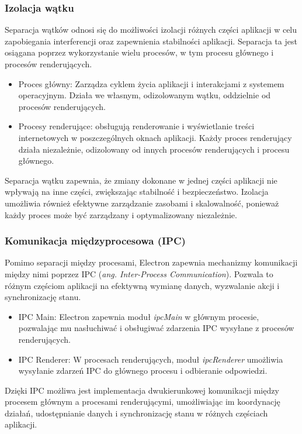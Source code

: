 \documentclass[12pt,a4paper,twoside]{article}
\begin{document}
\subsubsection*{Izolacja wątku}
Separacja wątków odnosi się do możliwości izolacji różnych części aplikacji w celu zapobiegania interferencji oraz zapewnienia stabilności aplikacji. Separacja ta jest osiągana poprzez wykorzystanie wielu procesów, w tym procesu głównego i procesów renderujących.
\begin{itemize}
	\item Proces główny: Zarządza cyklem życia aplikacji i interakcjami z systemem operacyjnym. Działa we własnym, odizolowanym wątku, oddzielnie od procesów renderujących.
	\item Procesy renderujące: obsługują renderowanie i wyświetlanie treści internetowych w poszczególnych oknach aplikacji. Każdy proces renderujący działa niezależnie, odizolowany od innych procesów renderujących i procesu głównego.
\end{itemize}
Separacja wątku zapewnia, że zmiany dokonane w jednej części aplikacji nie wpływają na inne części, zwiększając stabilność i bezpieczeństwo. Izolacja umożliwia również efektywne zarządzanie zasobami i skalowalność, ponieważ każdy proces może być zarządzany i optymalizowany niezależnie.
\subsubsection*{Komunikacja międzyprocesowa (IPC)}
Pomimo separacji między procesami, Electron zapewnia mechanizmy komunikacji między nimi poprzez IPC (\textit{ang. Inter-Process Communication}). Pozwala to różnym częściom aplikacji na efektywną wymianę danych, wyzwalanie akcji i synchronizację stanu.
\begin{itemize}
	\item IPC Main: Electron zapewnia moduł \textit{ipcMain} w głównym procesie, pozwalając mu nasłuchiwać i obsługiwać zdarzenia IPC wysyłane z procesów renderujących.
	\item IPC Renderer: W procesach renderujących, moduł \textit{ipcRenderer}	 umożliwia wysyłanie zdarzeń IPC do głównego procesu i odbieranie odpowiedzi.
\end{itemize}
Dzięki IPC możliwa jest implementacja dwukierunkowej komunikacji między procesem głównym a procesami renderującymi, umożliwiając im koordynację działań, udostępnianie danych i synchronizację stanu w różnych częściach aplikacji.\par
\newpage
\end{document}
